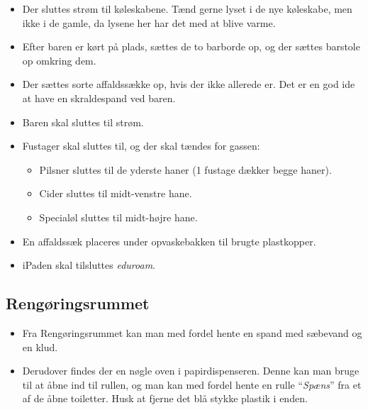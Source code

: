 \begin{itemize}
	\item Der sluttes strøm til køleskabene. Tænd gerne lyset i de nye køleskabe, men ikke i de gamle, 
	da lysene her har det med at blive varme.
	\item Efter baren er kørt på plads, sættes de to barborde op, og der sættes barstole op omkring dem.
	\item Der sættes sorte affaldssække op, hvis der ikke allerede er. 
		Det er en god ide at have en skraldespand ved baren.
	\item Baren skal sluttes til strøm.
	\item Fustager skal sluttes til, og der skal tændes for gassen:
	\begin{itemize}
		\item Pilsner sluttes til de yderste haner (1 fustage dækker begge
		haner).
		\item Cider sluttes til midt-venstre hane.
		\item Specialøl sluttes til midt-højre hane.
	\end{itemize}
	\item En affaldssæk placeres under opvaskebakken til brugte plastkopper.
	\item iPaden skal tilsluttes \textit{eduroam}.
\end{itemize}

\subsection{Rengøringsrummet}
\label{sec:pre:rengøring}
\begin{itemize}
	\item Fra Rengøringsrummet kan man med fordel hente en spand med sæbevand og en klud.
	\item Derudover findes der en nøgle oven i papirdispenseren. Denne kan man bruge til 
	at åbne ind til rullen, og man kan med fordel hente en rulle ``\textit{Spæns}'' 
	fra et af de åbne toiletter. Husk at fjerne det blå stykke plastik i enden.
\end{itemize}